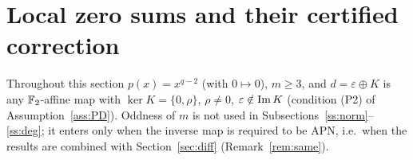 \section{Local zero sums and their certified correction}\label{sec:repair}

Throughout this section $p(x)=x^{q-2}$ (with $0\mapsto0$), $m\ge3$, and $d=\varepsilon\oplus K$ is any
$\mathbb{F}_2$-affine map with $\ker K=\{0,\rho\}$, $\rho\ne0$, $\varepsilon\notin\mathrm{Im}\, K$ (condition (P2) of
Assumption~\ref{ass:PD}). Oddness of $m$ is not used in Subsections~\ref{ss:norm}--\ref{ss:deg}; it enters
only when the inverse map is required to be APN, i.e.\ when the results are combined with
Section~\ref{sec:diff} (Remark~\ref{rem:same}).

